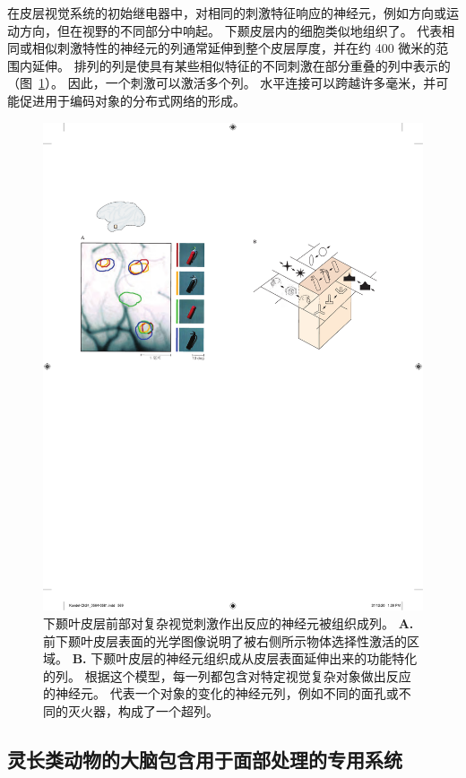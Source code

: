 在皮层视觉系统的初始继电器中，对相同的刺激特征响应的神经元，例如方向或运动方向，但在视野的不同部分中响起。
下颞皮层内的细胞类似地组织了。
代表相同或相似刺激特性的神经元的列通常延伸到整个皮层厚度，并在约 400 微米的范围内延伸。
排列的列是使具有某些相似特征的不同刺激在部分重叠的列中表示的（图~\ref{fig:24_5}）。
因此，一个刺激可以激活多个列。
水平连接可以跨越许多毫米，并可能促进用于编码对象的分布式网络的形成。


\begin{figure}[htbp]
	\centering
	\includegraphics[width=0.8\linewidth]{chap24/fig_24_5}
	\caption{下颞叶皮层前部对复杂视觉刺激作出反应的神经元被组织成列。
		\textbf{A.} 前下颞叶皮层表面的光学图像说明了被右侧所示物体选择性激活的区域。
		\textbf{B.} 下颞叶皮层的神经元组织成从皮层表面延伸出来的功能特化的列。
		根据这个模型，每一列都包含对特定视觉复杂对象做出反应的神经元。
		代表一个对象的变化的神经元列，例如不同的面孔或不同的灭火器，构成了一个超列。}
	\label{fig:24_5}
\end{figure}



\subsection{灵长类动物的大脑包含用于面部处理的专用系统}

